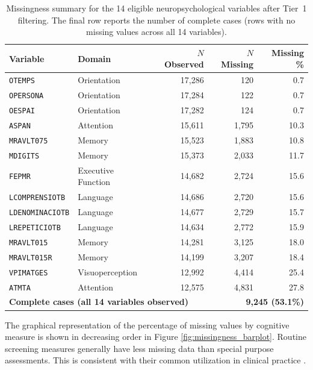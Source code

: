 \begin{table}[ht]
\caption{Missingness summary for the 14 eligible neuropsychological variables after Tier~1 filtering. The final row reports the number of complete cases (rows with no missing values across all 14 variables).}
\label{tab:missing_descriptive}
\centering
\small
\begin{tabular}{l l r r r}
\toprule
\textbf{Variable} & \textbf{Domain} & \textbf{$N$ Observed} & \textbf{$N$ Missing} & \textbf{Missing \%} \\
\midrule
\texttt{OTEMPS}          & Orientation        & 17{,}286 &   120 &  0.7 \\
\texttt{OPERSONA}        & Orientation        & 17{,}284 &   122 &  0.7 \\
\texttt{OESPAI}          & Orientation        & 17{,}282 &   124 &  0.7 \\
\texttt{ASPAN}           & Attention          & 15{,}611 & 1{,}795 & 10.3 \\
\texttt{MRAVLT075}       & Memory             & 15{,}523 & 1{,}883 & 10.8 \\
\texttt{MDIGITS}         & Memory             & 15{,}373 & 2{,}033 & 11.7 \\
\texttt{FEPMR}           & Executive Function & 14{,}682 & 2{,}724 & 15.6 \\
\texttt{LCOMPRENSIOTB}   & Language           & 14{,}686 & 2{,}720 & 15.6 \\
\texttt{LDENOMINACIOTB}  & Language           & 14{,}677 & 2{,}729 & 15.7 \\
\texttt{LREPETICIOTB}    & Language           & 14{,}634 & 2{,}772 & 15.9 \\
\texttt{MRAVLT015}       & Memory             & 14{,}281 & 3{,}125 & 18.0 \\
\texttt{MRAVLT015R}      & Memory             & 14{,}199 & 3{,}207 & 18.4 \\
\texttt{VPIMATGES}       & Visuoperception    & 12{,}992 & 4{,}414 & 25.4 \\
\texttt{ATMTA}           & Attention          & 12{,}575 & 4{,}831 & 27.8 \\
\midrule
\multicolumn{3}{l}{\textbf{Complete cases (all 14 variables observed)}} & \multicolumn{2}{r}{\textbf{9{,}245 (53.1\%)}} \\
\bottomrule
\end{tabular}
\end{table}

The graphical representation of the percentage of missing values by cognitive measure is shown in decreasing order in Figure \ref{fig:missingness_barplot}. Routine screening measures generally have less missing data than special purpose assessments. This is consistent with their common utilization in clinical practice \parencite{lezak2012neuropsychological}.

